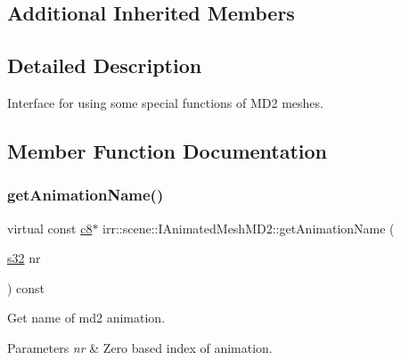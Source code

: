 \subsection*{Additional Inherited Members}


\subsection{Detailed Description}
Interface for using some special functions of M\+D2 meshes. 

\subsection{Member Function Documentation}
\mbox{\label{classirr_1_1scene_1_1IAnimatedMeshMD2_aa619158d0fc11ea1032d838abf3566ca}} 
\subsubsection{\texorpdfstring{get\+Animation\+Name()}{getAnimationName()}}
{\footnotesize\ttfamily virtual const \hyperlink{namespaceirr_a9395eaea339bcb546b319e9c96bf7410}{c8}$\ast$ irr\+::scene\+::\+I\+Animated\+Mesh\+M\+D2\+::get\+Animation\+Name (\begin{DoxyParamCaption}\item[{\hyperlink{namespaceirr_ac66849b7a6ed16e30ebede579f9b47c6}{s32}}]{nr }\end{DoxyParamCaption}) const\hspace{0.3cm}{\ttfamily [pure virtual]}}



Get name of md2 animation. 


\begin{DoxyParams}{Parameters}
{\em nr} & Zero based index of animation. \\
\hline
\end{DoxyParams}
\mbox{\label{classirr_1_1scene_1_1IAnimatedMeshMD2_a0bab7f9b11fd11f1fa8f2cd6e085b596}} 
